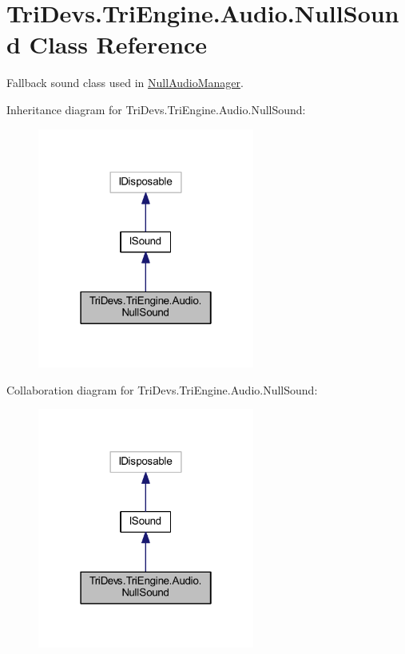 \hypertarget{class_tri_devs_1_1_tri_engine_1_1_audio_1_1_null_sound}{\section{Tri\-Devs.\-Tri\-Engine.\-Audio.\-Null\-Sound Class Reference}
\label{class_tri_devs_1_1_tri_engine_1_1_audio_1_1_null_sound}
}


Fallback sound class used in \hyperlink{class_tri_devs_1_1_tri_engine_1_1_audio_1_1_null_audio_manager}{Null\-Audio\-Manager}.  




Inheritance diagram for Tri\-Devs.\-Tri\-Engine.\-Audio.\-Null\-Sound\-:
\nopagebreak
\begin{figure}[H]
\begin{center}
\leavevmode
\includegraphics[width=202pt]{class_tri_devs_1_1_tri_engine_1_1_audio_1_1_null_sound__inherit__graph}
\end{center}
\end{figure}


Collaboration diagram for Tri\-Devs.\-Tri\-Engine.\-Audio.\-Null\-Sound\-:
\nopagebreak
\begin{figure}[H]
\begin{center}
\leavevmode
\includegraphics[width=202pt]{class_tri_devs_1_1_tri_engine_1_1_audio_1_1_null_sound__coll__graph}
\end{center}
\end{figure}
